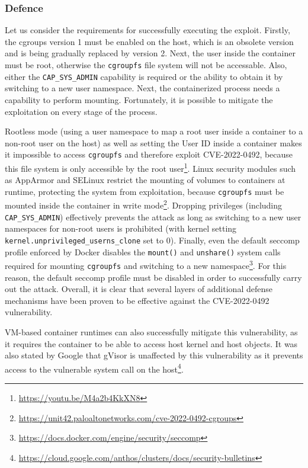 

\subsubsection*{Defence}
Let us consider the requirements for successfully executing the exploit. Firstly, the cgroups version 1 must be enabled on the host, which is an obsolete version and is being gradually replaced by version 2. Next, the user inside the container must be root, otherwise the \texttt{cgroupfs} file system will not be accessable. Also, either the \texttt{CAP\_SYS\_ADMIN} capability is required or the ability to obtain it by switching to a new user namespace. Next, the containerized process needs a capability to perform mounting. Fortunately, it is possible to mitigate the exploitation on every stage of the process.

Rootless mode (using a user namespace to map a root user inside a container to a non-root user on the host) as well as setting the User ID inside a container makes it impossible to access \texttt{cgroupfs} and therefore exploit CVE-2022-0492, because this file system is only accessible by the root user\footnote{\url{https://youtu.be/M4a2b4KkXN8}}. Linux security modules such as AppArmor and SELinux restrict the mounting of volumes to containers at runtime, protecting the system from exploitation, because \texttt{cgroupfs} must be mounted inside the container in write mode\footnote{\url{https://unit42.paloaltonetworks.com/cve-2022-0492-cgroups}}. Dropping privileges (including \texttt{CAP\_SYS\_ADMIN}) effectively prevents the attack as long as switching to a new user namespaces for non-root users is prohibited (with kernel setting \texttt{kernel.unprivileged\_userns\_clone} set to 0). Finally, even the default seccomp profile enforced by Docker disables the \texttt{mount()} and \texttt{unshare()} system calls required for mounting \texttt{cgroupfs} and switching to a new namespace\footnote{\url{https://docs.docker.com/engine/security/seccomp}}. For this reason, the default seccomp profile must be disabled in order to successfully carry out the attack. Overall, it is clear that several layers of additional defense mechanisms have been proven to be effective against the CVE-2022-0492 vulnerability.

VM-based container runtimes can also successfully mitigate this vulnerability, as it requires the container to be able to access host kernel and host objects. It was also stated by Google that gVisor is unaffected by this vulnerability as it prevents access to the vulnerable system call on the host\footnote{\url{https://cloud.google.com/anthos/clusters/docs/security-bulletins}}.

